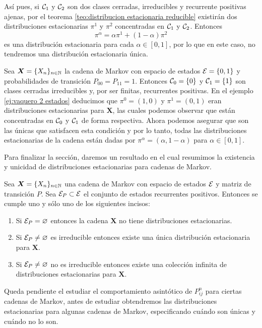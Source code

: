 Así pues, si $\mathcal{C}_1$ y $\mathcal{C}_2$ son dos clases cerradas, irreducibles y recurrente positivas ajenas, por el teorema \ref{teo:distribucion estacionaria reducible} existirán dos distribuciones estacionarias $\pi^1$ y $\pi^2$ concentradas en $\mathcal{C}_1$ y $\mathcal{C}_2$. Entonces 
\[
    \pi^\alpha = \alpha \pi^1 + (1- \alpha) \pi^2
\]
es una distribución estacionaria para cada $\alpha \in [0,1]$, por lo que en este caso, no tendremos una distribución estacionaria única.

\begin{example}
    Sea $\bm X = \{X_n\}_{n \in \mathbb{N}}$ la cadena de Markov con espacio de estados $\mathcal{E} = \{0,1\}$ y probabilidades de transición $P_{00} = P_{11} = 1$. Entonces $\mathcal{C}_0 = \{0\}$ y $\mathcal{C}_1 = \{1\}$ son clases cerradas irreducibles y, por ser finitas, recurrentes positivas. En el ejemplo \ref{ej:vaquero 2 estados} deducimos que $\pi^0 = (1,0)$ y $\pi^1 = (0,1)$ eran distribuciones estacionarias para $\bm X$, las cuales podemos observar que están concentradas en $\mathcal{C}_0$ y $\mathcal{C}_1$ de forma respectiva. Ahora podemos asegurar que son las únicas que satisfacen esta condición y por lo tanto, todas las distribuciones estacionarias de la cadena están dadas por $\pi^\alpha = (\alpha, 1 - \alpha)$ para $\alpha \in [0,1]$.
\end{example}

Para finalizar la sección, daremos un resultado en el cual resumimos la existencia y unicidad de distribuciones estacionarias para cadenas de Markov.

\begin{proposition}
    Sea $\bm X = \{X_n\}_{n \in \mathbb{N}}$ una cadena de Markov con espacio de estados $\mathcal{E}$ y matriz de transición $P$. Sea $\mathcal{E}_P \subset \mathcal{E}$ el conjunto de estados recurrentes positivos. Entonces se cumple uno y sólo uno de los siguientes incisos:
    \begin{enumerate}
        \item Si $\mathcal{E}_P = \varnothing$ entonces la cadena $\bm X$ no tiene distribuciones estacionarias.
        \item Si $\mathcal{E}_P \neq \varnothing$ es irreducible entonces existe una única distribución estacionaria para $\bm X$.
        \item Si $\mathcal{E}_P \neq \varnothing$ no es irreducible entonces existe una colección infinita de distribuciones estacionarias para $\bm X$.
    \end{enumerate}
\end{proposition}

Queda pendiente el estudiar el comportamiento asintótico de $P_{ij}^n$ para ciertas cadenas de Markov, antes de estudiar obtendremos las distribuciones estacionarias para algunas cadenas de Markov, especificando cuándo son únicas y cuándo no lo son.